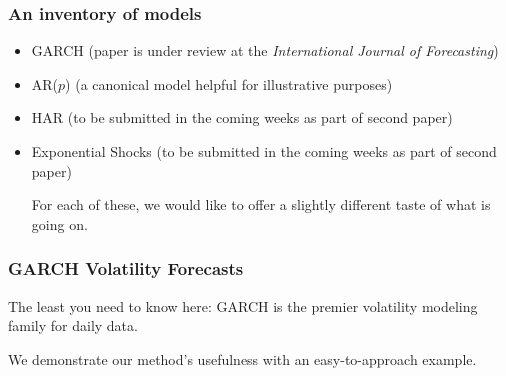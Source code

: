 \documentclass[9pt]{beamer}
\theoremstyle{definition}
\begin{document}
\begin{frame}
    \frametitle{An inventory of models}

    \begin{itemize}
        \item <1-> GARCH (paper is under review at the \textit{International Journal of Forecasting})
        \item <2-> AR($p$) (a canonical model helpful for illustrative purposes)
        \item <3-> HAR (to be submitted in the coming weeks as part of second paper)
        \item <4-> Exponential Shocks (to be submitted in the coming weeks as part of second paper)

        For each of these, we would like to offer a slightly different taste of what is going on.
    \end{itemize}
\end{frame}

\begin{frame}
    \frametitle{GARCH Volatility Forecasts}
    The least you need to know here: GARCH is the premier volatility modeling family for daily data.

    \bigskip

    We demonstrate our method's usefulness with an easy-to-approach example.
\end{frame}




    
\end{document}
